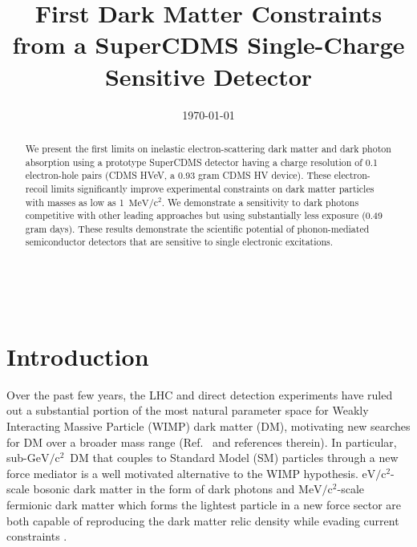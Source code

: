 \documentclass[%
reprint,
superscriptaddress,
preprintnumbers,
amsmath,amssymb,
prl,
aps,
floatfix
]{revtex4-1}
\newcommand{\eV}{$\mathrm{eV/c^2}$}
\newcommand{\MeV}{$\mathrm{MeV/c^2}$}
\newcommand{\GeV}{$\mathrm{GeV/c^2}$}
\begin{document}
\title{First Dark Matter Constraints from a SuperCDMS Single-Charge Sensitive Detector}



\date{\today}%

\setcounter{figure}{0}
\begin{abstract}
We present the first limits on inelastic electron-scattering dark matter and dark photon absorption using a prototype SuperCDMS detector having a charge resolution of 0.1 electron-hole pairs (CDMS HVeV, a 0.93 gram CDMS HV device). These electron-recoil limits significantly improve experimental constraints on dark matter particles with masses as low as 1~\MeV. We demonstrate a sensitivity to dark photons competitive with other leading approaches but using substantially less exposure (0.49 gram days). These results demonstrate the scientific potential of phonon-mediated semiconductor detectors that are sensitive to single electronic excitations. 
\end{abstract}

\maketitle

~\\

\section{Introduction}
Over the past few years, the LHC and direct detection experiments have ruled out a substantial portion of the most natural parameter space for Weakly Interacting Massive Particle (WIMP) dark matter (DM), motivating new searches for DM over a broader mass range (Ref.~\cite{CosmicVisions} and references therein). In particular, sub-\GeV~DM that couples to Standard Model (SM) particles through a new force mediator is a well motivated alternative to the WIMP hypothesis\cite{LightDarkSectors,DarkSectors,Essig2012}. \eV-scale bosonic dark matter in the form of dark photons \cite{Okun,Holdom,galiston} and \MeV-scale fermionic dark matter which forms the lightest particle in a new force sector \cite{Boehm:2003hm,Pospelov} are both capable of reproducing the dark matter relic density while evading current constraints \cite{An,Izaguirre,Essig}.
\end{document}
